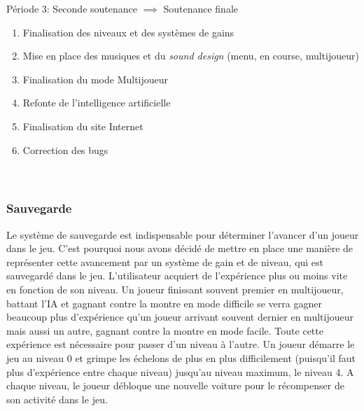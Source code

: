 \documentclass[a4paper,12pt]{article}
\begin{document}
         \begin{description}
    \item Période 3: Seconde soutenance \(\implies\) Soutenance finale
        \begin{enumerate}
            \item Finalisation des niveaux et des systèmes de gains
            \item Mise en place des musiques et du \textit{sound design} (menu, en course, multijoueur)
            \item Finalisation du mode Multijoueur
            \item Refonte de l'intelligence artificielle
            \item Finalisation du site Internet
            \item Correction des bugs
                \\
                \\
                \\
        \end{enumerate}
   \end{description}  
        
        
            \subsubsection{Sauvegarde}
               Le système de sauvegarde est indispensable pour déterminer l'avancer d'un joueur dans le jeu. C'est 
               pourquoi nous avons décidé de mettre en place une manière de représenter cette avancement par un système 
               de gain et de niveau, qui est sauvegardé dans le jeu. L'utilisateur acquiert de l'expérience plus ou 
               moins vite en fonction de son niveau. Un joueur finissant souvent premier en multijoueur, battant l'IA et
               gagnant contre la montre en mode difficile se verra gagner beaucoup plus d'expérience qu'un joueur 
               arrivant souvent dernier en multijoueur mais aussi un autre, gagnant contre la montre en mode facile. 
               Toute cette expérience est nécessaire pour passer d'un niveau à l'autre. Un joueur démarre le jeu au 
               niveau 0 et grimpe les échelons de plus en plus difficilement (puisqu'il faut plus d'expérience entre 
               chaque niveau) jusqu'au niveau maximum, le niveau 4. A chaque niveau, le joueur débloque une nouvelle 
               voiture pour le récompenser de son activité dans le jeu.
               
\end{document}
